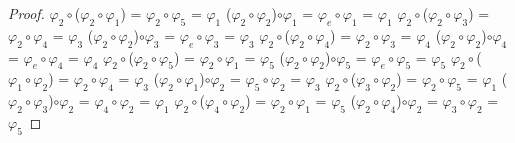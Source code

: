 \documentclass[10pt,a4paper,oneside]{article}
\begin{document}
\begin{proof}
				\newline
				\newline
				$\varphi_{2}\circ$($\varphi_{2}\circ\varphi_{1}$) = $\varphi_{2}\circ\varphi_{5}$ = $\varphi_{1}$
				\newline
				($\varphi_{2}\circ\varphi_{2}$)$\circ\varphi_{1}$ = $\varphi_{e}\circ\varphi_{1}$ = $\varphi_{1}$
				\newline
				\newline
				$\varphi_{2}\circ$($\varphi_{2}\circ\varphi_{3}$) = $\varphi_{2}\circ\varphi_{4}$ = $\varphi_{3}$
				\newline
				($\varphi_{2}\circ\varphi_{2}$)$\circ\varphi_{3}$ = $\varphi_{e}\circ\varphi_{3}$ = $\varphi_{3}$
				\newline
				\newline
				$\varphi_{2}\circ$($\varphi_{2}\circ\varphi_{4}$) = $\varphi_{2}\circ\varphi_{3}$ = $\varphi_{4}$
				\newline
				($\varphi_{2}\circ\varphi_{2}$)$\circ\varphi_{4}$ = $\varphi_{e}\circ\varphi_{4}$ = $\varphi_{4}$
				\newline
				\newline
				$\varphi_{2}\circ$($\varphi_{2}\circ\varphi_{5}$) = $\varphi_{2}\circ\varphi_{1}$ = $\varphi_{5}$
				\newline
				($\varphi_{2}\circ\varphi_{2}$)$\circ\varphi_{5}$ = $\varphi_{e}\circ\varphi_{5}$ = $\varphi_{5}$
				\newline
				\newline
				$\varphi_{2}\circ$($\varphi_{1}\circ\varphi_{2}$) = $\varphi_{2}\circ\varphi_{4}$ = $\varphi_{3}$
				\newline
				($\varphi_{2}\circ\varphi_{1}$)$\circ\varphi_{2}$ = $\varphi_{5}\circ\varphi_{2}$ = $\varphi_{3}$
				\newline
				\newline
				$\varphi_{2}\circ$($\varphi_{3}\circ\varphi_{2}$) = $\varphi_{2}\circ\varphi_{5}$ = $\varphi_{1}$
				\newline
				($\varphi_{2}\circ\varphi_{3}$)$\circ\varphi_{2}$ = $\varphi_{4}\circ\varphi_{2}$ = $\varphi_{1}$
				\newline
				\newline
				$\varphi_{2}\circ$($\varphi_{4}\circ\varphi_{2}$) = $\varphi_{2}\circ\varphi_{1}$ = $\varphi_{5}$
				\newline
				($\varphi_{2}\circ\varphi_{4}$)$\circ\varphi_{2}$ = $\varphi_{3}\circ\varphi_{2}$ = $\varphi_{5}$
				\newline

\end{proof}
\end{document}

